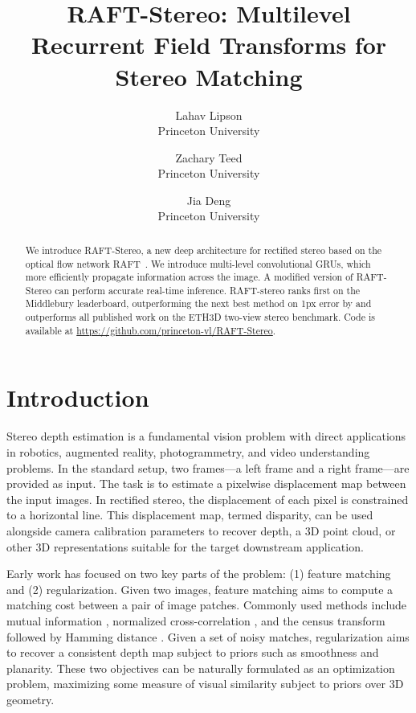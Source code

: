 \documentclass[10pt,twocolumn,letterpaper]{article}
\begin{document}
\title{RAFT-Stereo: Multilevel Recurrent Field Transforms for Stereo Matching}

\author{Lahav Lipson\\
Princeton University\\

\and
Zachary Teed\\
Princeton University\\

\and
Jia Deng\\
Princeton University\\
}

\maketitle


\begin{abstract}
   We introduce RAFT-Stereo, a new deep architecture for rectified stereo based on the optical flow network RAFT~\cite{teed2020raft}. We introduce multi-level convolutional GRUs, which more efficiently propagate information across the image. A modified version of RAFT-Stereo can perform accurate real-time inference. RAFT-stereo ranks first on the Middlebury leaderboard, outperforming the next best method on 1px error by  and outperforms all published work on the ETH3D two-view stereo benchmark. Code is available at \url{https://github.com/princeton-vl/RAFT-Stereo}.
\end{abstract}

\section{Introduction}
Stereo depth estimation is a fundamental vision problem with direct applications in robotics, augmented reality, photogrammetry, and video understanding problems. In the standard setup, two frames---a left frame and a right frame---are provided as input. The task is to estimate a pixelwise displacement map between the input images. In rectified stereo, the displacement of each pixel is constrained to a horizontal line. This displacement map, termed disparity, can be used alongside camera calibration parameters to recover depth, a 3D point cloud, or other 3D representations suitable for the target downstream application.


Early work has focused on two key parts of the problem: (1) feature matching and (2) regularization. Given two images, feature matching aims to compute a matching cost between a pair of image patches. Commonly used methods include mutual information \cite{hirschmuller2007stereo}, normalized cross-correlation \cite{heo2010robust}, and the census transform followed by Hamming distance \cite{fife2012improved}.  Given a set of noisy matches, regularization aims to recover a consistent depth map subject to priors such as smoothness and planarity. These two objectives can be naturally formulated as an optimization problem, maximizing some measure of visual similarity subject to priors over 3D geometry.
\end{document}
